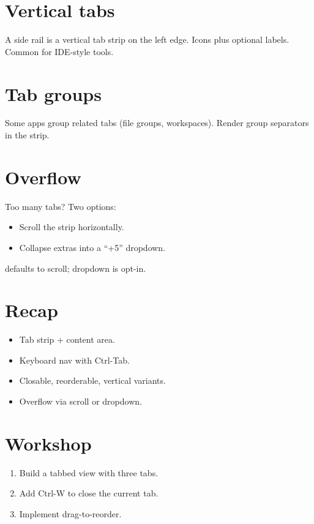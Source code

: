 \section{Vertical tabs}

A side rail is a vertical tab strip on the left edge. Icons
plus optional labels. Common for IDE-style tools.

\section{Tab groups}

Some apps group related tabs (file groups, workspaces).
Render group separators in the strip.

\section{Overflow}

Too many tabs? Two options:

\begin{itemize}[leftmargin=*]
  \item Scroll the strip horizontally.
  \item Collapse extras into a ``+5'' dropdown.
\end{itemize}

\maya{} defaults to scroll; dropdown is opt-in.

\section{Recap}

\begin{recap}
\begin{itemize}[leftmargin=*]
  \item Tab strip + content area.
  \item Keyboard nav with Ctrl-Tab.
  \item Closable, reorderable, vertical variants.
  \item Overflow via scroll or dropdown.
\end{itemize}
\end{recap}

\section*{Workshop}

\begin{enumerate}[leftmargin=*]
  \item Build a tabbed view with three tabs.
  \item Add Ctrl-W to close the current tab.
  \item Implement drag-to-reorder.
\end{enumerate}
